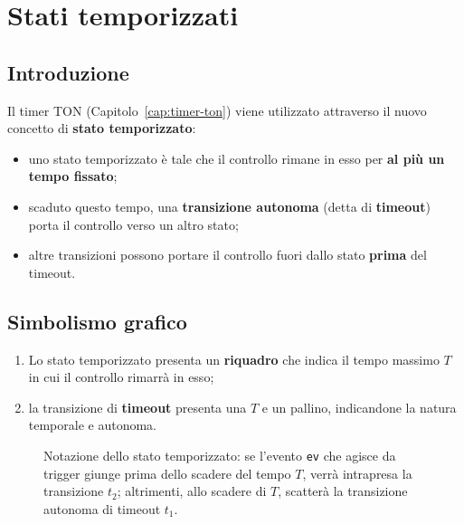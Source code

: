 \chapter{Stati temporizzati}
\label{cap:stati-temporizzati}

\section{Introduzione}
Il timer TON (Capitolo~\ref{cap:timer-ton}) viene utilizzato attraverso il nuovo concetto di \textbf{stato temporizzato}:
\begin{itemize}
    \item uno stato temporizzato è tale che il controllo rimane in esso per \textbf{al più un tempo fissato};
    \item scaduto questo tempo, una \textbf{transizione autonoma} (detta di \textbf{timeout}) porta il controllo verso un altro stato;
    \item altre transizioni possono portare il controllo fuori dallo stato \textbf{prima} del timeout.
\end{itemize}

\section{Simbolismo grafico}
\begin{enumerate}
    \item Lo stato temporizzato presenta un \textbf{riquadro} che indica il tempo massimo $T$ in cui il controllo rimarrà in esso;
    \item la transizione di \textbf{timeout} presenta una $T$ e un pallino, indicandone la natura temporale e autonoma.
\end{enumerate}

\begin{figure}[htbp]
\centering
{}
\caption{Notazione dello stato temporizzato: se l'evento \texttt{ev} che agisce da trigger giunge prima dello scadere del tempo $T$, verrà intrapresa la transizione $t_2$; altrimenti, allo scadere di $T$, scatterà la transizione autonoma di timeout $t_1$.}
\label{fig:stato-temporizzato}
\end{figure}

